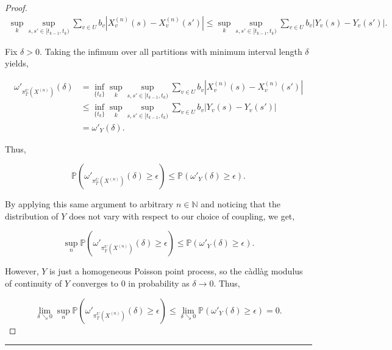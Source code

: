 \documentclass[12pt]{article}
\newcommand{\mb}{\mathbb}
\newcommand{\ra}{\rightarrow}
\newcommand{\ep}{\epsilon}
\newcommand{\lin}{\rule{\linewidth}{0.4 pt}}
\newcommand{\pr}{\mb{P}}							%
\renewcommand{\v}{v}							%
\renewcommand{\U}{U}							%
\renewcommand{\b}{b}							%
\newcommand{\T}{T}								%
\renewcommand{\t}{t}							%
\newcommand{\proj}{\pi}							%
\renewcommand{\tt}{s}							%
\newcommand{\ttt}{s'}							%
\newcommand{\X}{X}								%
\newcommand{\vsi}[1]{^{#1}}						%
\newcommand{\cind}[1]{_{#1}}					%
\newcommand{\tp}[1]{(#1)}						%
\newcommand{\ts}[1]{_{#1}}						%
\newcommand{\sln}[1]{^{(#1)}}					%
\newcommand{\indx}[1]{_{#1}}					%
\newcommand{\XX}{Y}								%
\renewcommand{\it}{k}							%
\begin{document}
\begin{proof}
\begin{align*}
\sup_\it\sup_{\tt,\ttt \in [\t\indx{\it-1},\t\indx{\it})} \sum_{\v\in \U} \b\cind{\v}|\X\sln{n}\cind{\v}\tp{\tt} - \X\sln{n}\cind{\v}\tp{\ttt}|\leq \sup_\it\sup_{\tt,\ttt \in [\t\indx{\it-1},\t\indx{\it})} \sum_{\v\in \U} \b\cind{\v}|\XX\cind{\v}\tp{\tt} - \XX\cind{\v}\tp{\ttt}|.
\end{align*}

Fix \(\delta > 0\). Taking the infimum over all partitions with minimum interval length \(\delta\) yields,

\begin{align*}
\omega'_{\proj\vsi{\U}\ts{\T}\left(\X\sln{n}\right)}(\delta) &= \inf_{\{\t\indx{\it}\}}\sup_\it\sup_{\tt,\ttt \in [\t\indx{\it-1},\t\indx{\it})} \sum_{\v\in \U} \b\cind{\v}|\X\sln{n}\cind{\v}\tp{\tt} - \X\sln{n}\cind{\v}\tp{\ttt}|\\
&\leq \inf_{\{\t\indx{\it}\}}\sup_\it\sup_{\tt,\ttt \in [\t\indx{\it-1},\t\indx{\it})} \sum_{\v\in \U} \b\cind{\v}|\XX\cind{\v}\tp{\tt} - \XX\cind{\v}\tp{\ttt}|\\
&= \omega'_{\XX}(\delta).
\end{align*}

Thus,

\[\pr\left(\omega'_{\proj\vsi{\U}\ts{\T}\left(\X\sln{n}\right)}(\delta) \geq \ep\right) \leq \pr\left(\omega'_{\XX}(\delta) \geq \ep\right).\]

By applying this same argument to arbitrary \(n\in \mb{N}\) and noticing that the distribution of \(\XX\) does not vary with respect to our choice of coupling, we get,

\[\sup_{n}\pr\left(\omega'_{\proj\vsi{\U}\ts{\T}\left(\X\sln{n}\right)}(\delta)\geq \ep\right) \leq \pr\left(\omega'_{\XX}(\delta) \geq \ep\right).\]

However, \(\XX\) is just a homogeneous Poisson point process, so the c\`adl\`ag modulus of continuity of \(\XX\) converges to 0 in probability as \(\delta \ra 0\). Thus,

\[\lim_{\delta \searrow 0}\sup_{n}\pr\left(\omega'_{\proj\vsi{\U}\ts{\T}\left(\X\sln{n}\right)}(\delta) \geq \ep\right) \leq \lim_{\delta\searrow 0}\pr\left(\omega'_{\XX}(\delta)\geq \ep\right) = 0.\]


\end{proof}

\lin
\end{document}

